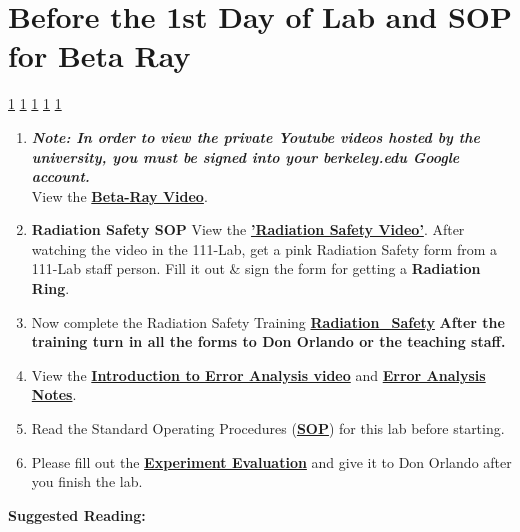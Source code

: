 \documentclass{../lab}
\begin{document}
\section{Before the 1st Day of Lab and SOP for Beta Ray}

\signatures \hyperlink{}{1} \hyperlink{}{1} \hyperlink{}{1} \hyperlink{}{1} \hyperlink{}{1} 

\begin{enumerate}
    \item \emph{\textbf{Note: In order to view the private Youtube videos hosted by the university, you must be signed into your berkeley.edu Google account.}} \\
    View the \href{http://youtu.be/qJ4MPtMmFPw}{\textbf{Beta-Ray Video}}.

    \item \textbf{Radiation Safety SOP} View the \href{http://youtu.be/KHxtzF5pZZM}{\textbf{'Radiation Safety Video'}}. After watching the video in the 111-Lab, get a pink Radiation Safety form from a 111-Lab staff person. Fill it out \& sign the form for getting a \textbf{Radiation Ring}.

    \item Now complete the Radiation Safety Training \href{http://experimentationlab.berkeley.edu/RadiationSafety}{\textbf{Radiation\_Safety}} \textbf{After the training turn in all the forms to Don Orlando or the teaching staff.}

    \item View the \href{\ErrorAnalysisVideo}{\textbf{Introduction to Error Analysis video}} and \href{\ErrorAnalysisNotes}{\textbf{\textbf{Error Analysis Notes}}}.

    \item Read the Standard Operating Procedures (\href{http://experimentationlab.berkeley.edu/sites/default/files/images/SOP\_3271\_Cs-137\_Na-22\_Co-60\_Mn-54\_Am-241\_Fe-55\_2014.pdf}{\textbf{SOP}}) for this lab before starting.

    \item Please fill out the \href{\ExperimentEvaluation}{\textbf{Experiment Evaluation}} and give it to Don Orlando after you finish the lab.

\end{enumerate}

\textbf{Suggested Reading:}
\end{document}

